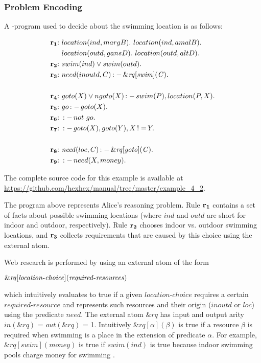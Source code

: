 \documentclass[a4paper, titlepage]{article}
\newcommand{\ext}[3]{\ensuremath{\&{\mathit{#1}}[#2](#3)}}
\DeclareMathOperator{\leftimpl}{:-}
\DeclareMathOperator{\noteq}{!=}
\newcommand{\examplelink}[1]{\url{https://github.com/hexhex/manual/tree/master/#1}}
\newcommand\mycenterline[1]{\par\smallskip\centerline{#1} \smallskip}
\newcommand{\row}[1]{%
  \ensuremath{\color{black}\ensuremath{\mathbf{#1}} \color{black}}%
}
\newcommand{\rowprefix}[1]{%
  \ensuremath{\color{black}\mathbf{#1{:}}\ }%
}
\begin{document}
\subsubsection{Problem Encoding}
A \hex-program used to decide about the swimming location is as 
follows:
\begin{exmp}
\label{swimExample}
\begin{align*}
\rowprefix{r_1}& location(ind, margB). \ location(ind, amalB). \ \\& 
location(outd, gansD). \ location(outd, altD). \\  
\rowprefix{r_2}& swim(ind) \vee swim(outd).\\ 
\rowprefix{r_3}& need(inoutd, C) \leftimpl \ext{\mathit{rq}}
{\mathit{swim}}{\mathit{C}}. \\
\\
\rowprefix{r_4}& goto(X) \vee ngoto(X) \leftimpl swim(P), 
location(P, X).\\
\rowprefix{r_5}& go \leftimpl goto(X).\\
\rowprefix{r_6}& \leftimpl not \ go. \\
\rowprefix{r_7}& \leftimpl goto(X), goto(Y), X \noteq Y. \\
\\
\rowprefix{r_8}& \mathit{need}(loc, C) \leftimpl 
\ext{\mathit{rq}}{\mathit{goto}}{\mathit{C}}. \\ 
\rowprefix{r_9}& \leftimpl need(X, money).
\end{align*}
\end{exmp}
The complete source code for this example is available at \examplelink{example_4_2}.

The \hex{} program above represents Alice's reasoning 
problem. Rule $\row{r_1}$ contains a set of facts about possible 
swimming locations (where $\mathit{ind}$ and 
$\mathit{outd}$ are short for indoor and outdoor, 
respectively). Rule $\row{r_2}$ chooses indoor vs. outdoor 
swimming locations, and $\row{r_3}$ collects requirements that 
are caused by this choice using the external atom. 

Web research is performed by using an external atom of the 
form 
\mycenterline{$\ext{\mathit{rq}}{\mathit{location}$-$
\mathit{choice}}{\mathit{required}$-$\mathit{resources}}$}
which intuitively 
evaluates to true if a given $\mathit{location}$-$\mathit{choice}$ 
requires a certain $\mathit{required}$-$\mathit{resource}$ and 
represents such resources  and their origin 
($\mathit{inoutd}$ or $\mathit{loc}$) using the predicate 
$\mathit{need}$. The external atom $\mathit{\&rq}$ has 
input and output arity $\mathit{in(\&rq)}$ = 
$\mathit{out(\&rq)}$ = 1. Intuitively  $\ext{\mathit{rq}}
{\mathit{\alpha}}{\mathit{\beta}}$ is true if a resource 
$\beta$ is required when swimming is a place in the 
extension of predicate $\alpha$. For example, 
$\ext{\mathit{rq}}{\mathit{swim}}{\mathit{money}}$ is true 
if $\mathit{swim(ind)}$ is true because indoor swimming 
pools charge money for swimming \cite{efikrs2015}. 
\end{document}
